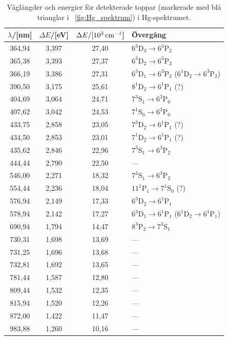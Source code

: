 \documentclass[11pt,a4paper]{article}
\newcommand{\figref}{\figurename~\ref}
\begin{document}
\begin{table}
\centering
\caption{Våglängder och energier för detekterade toppar (markerade med
  blå trianglar i \figref{fig:Hg_spektrum}) i Hg-spektrumet. } 
\label{tab:Hg_toppar}
\begin{tabular}{|c|c|c||l|}\hline
$\lambda$/[nm] & $\Delta E$/[eV]  &$\Delta E/[\unit[10^3]{cm^{-1}}$]
& Övergång\\ \hline
364,94  	& 3,397 	& 27,40
& $6^3\mathrm{D}_3\to 6^3\mathrm{P}_2$ 
\\ 
365,38  	& 3,393 	& 27,37 
& $6^3\mathrm{D}_2\to 6^3\mathrm{P}_2$ 
\\ 
366,19  	& 3,386 	& 27,31 
& $6^3\mathrm{D}_1\to 6^3\mathrm{P}_2$ 
  ($6^1\mathrm{D}_2\to 6^3\mathrm{P}_2$)
\\ 
390,50  	& 3,175 	& 25,61 
& $8^1\mathrm{D}_2\to 6^1\mathrm{P}_1$ (?)
\\ 
404,69  	& 3,064 	& 24,71 
& $7^3\mathrm{S}_1\to 6^3\mathrm{P}_0$ 
\\ 
407,62  	& 3,042 	& 24,53 
& $7^1\mathrm{S}_0\to 6^3\mathrm{P}_0$ 
\\ 
433,75  	& 2,858 	& 23,05 
& $7^3\mathrm{D}_2\to 6^1\mathrm{P}_1$ (?)
\\ 
434,50  	& 2,853 	& 23,01 
& $7^1\mathrm{D}_2\to 6^1\mathrm{P}_1$ (?)
\\ 
435,62  	& 2,846 	& 22,96 
& $7^3\mathrm{S}_1\to 6^3\mathrm{P}_2$ 
\\ 
444,44  	& 2,790 	& 22,50 
& --- 
\\ 
546,00  	& 2,271 	& 18,32 
& $7^3\mathrm{S}_1\to 6^3\mathrm{P}_2$ 
\\ 
554,44  	& 2,236 	& 18,04 
& $11^1\mathrm{P}_1\to 7^1\mathrm{S}_0$ (?)
\\ 
576,94  	& 2,149 	& 17,33 
& $6^3\mathrm{D}_2\to 6^1\mathrm{P}_1$ 
\\ 
578,94  	& 2,142 	& 17,27 
& $6^3\mathrm{D}_1\to 6^1\mathrm{P}_1$ 
  ($6^1\mathrm{D}_2\to 6^1\mathrm{P}_1$) 
\\ 
690,94  	& 1,794 	& 14,47 
& $8^3\mathrm{P}_2\to 7^3\mathrm{S}_1$ 
\\ 
730,31  	& 1,698 	& 13,69 & --- \\ 
731,25  	& 1,696 	& 13,68 & --- \\ 
732,81  	& 1,692 	& 13,65 & --- \\ 
781,44  	& 1,587 	& 12,80 & --- \\ 
809,44  	& 1,532 	& 12,35 & --- \\ 
815,94  	& 1,520 	& 12,26 & --- \\ 
872,00  	& 1,422 	& 11,47 & --- \\ 
983,88  	& 1,260 	& 10,16 & --- \\ 
\hline
\end{tabular}
\end{table}
\end{document}
